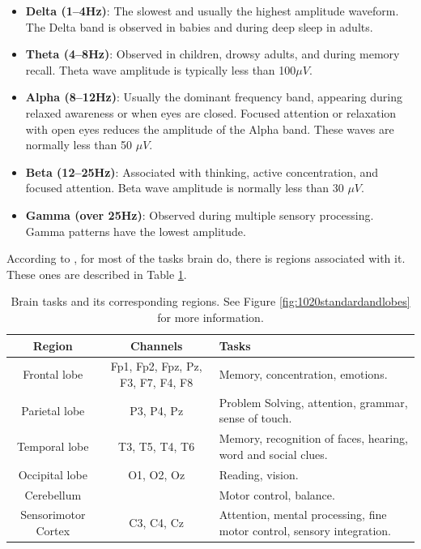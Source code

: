 		\begin{itemize}
			\item \textbf{Delta (1–4Hz)}: The slowest and usually the highest amplitude waveform. The Delta band is observed in babies and during deep sleep in adults.
			
			\item \textbf{Theta (4–8Hz)}: Observed in children, drowsy adults, and during memory recall. Theta wave amplitude is typically less than 100$\mu V$.
			
			\item \textbf{Alpha (8–12Hz)}: Usually the dominant frequency band, appearing during relaxed awareness or when eyes are closed. Focused attention or relaxation with open eyes reduces the amplitude of the Alpha band. These waves are normally less than 50 $\mu V$.
			
			\item \textbf{Beta (12–25Hz)}: Associated with thinking, active concentration, and focused attention. Beta wave amplitude is normally less than 30 $\mu V$.
			
			\item \textbf{Gamma (over 25Hz)}: Observed during multiple sensory processing. Gamma patterns have the lowest amplitude.
		\end{itemize}

		\par According to \cite{JALALYBIDGOLY2020101788}, for most of the tasks brain do, there is regions associated with it. These ones are described in Table \ref{tb:brainRegions}.
	
		\begin{table}[H]
			\begin{center}
				\caption{Brain tasks and its corresponding regions. See Figure \ref{fig:1020standardandlobes} for more information.}
				\begin{tabular}{|c|c|p{}|}
					\hline
					Region & Channels & Tasks\\
					\hline
					Frontal lobe & Fp1, Fp2, Fpz, Pz, F3, F7, F4, F8 & Memory, concentration, emotions.\\
					\hline
					Parietal lobe& P3, P4, Pz & Problem Solving, attention, grammar, sense of touch. \\
					\hline
					Temporal lobe& T3, T5, T4, T6 & Memory, recognition of faces, hearing, word and social clues. \\
					\hline
					Occipital lobe & O1, O2, Oz & Reading, vision.\\
					\hline
					Cerebellum && Motor control, balance. \\
					\hline
					Sensorimotor Cortex & C3, C4, Cz& Attention, mental processing, ﬁne motor control, sensory integration. \\
					\hline
				\end{tabular}
				\label{tb:brainRegions}
			\end{center}
		\end{table}
	
